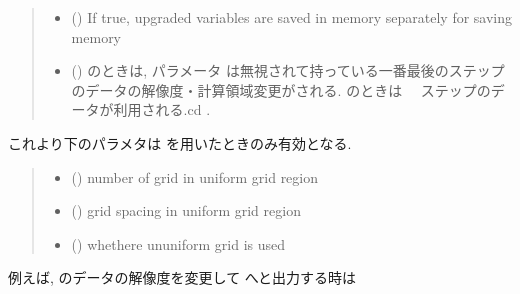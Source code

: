 \documentclass[letterpaper,10pt,dvipdfmx,report]{sphinxmanual}
\begin{document}
\begin{fulllineitems}
\begin{quote}
\begin{description}
\begin{itemize}
\item {} 
\sphinxAtStartPar
{} () \sphinxhyphen{}\sphinxhyphen{} If true, upgraded variables are saved in memory separately for saving memory

\item {} 
\sphinxAtStartPar
{} () \sphinxhyphen{}\sphinxhyphen{}  のときは, パラメータ  は無視されて持っている一番最後のステップのデータの解像度・計算領域変更がされる.  のときは　 ステップのデータが利用される.cd .

\end{itemize}

\end{description}\end{quote}

\sphinxAtStartPar
これより下のパラメタは  を用いたときのみ有効となる.
\begin{quote}\begin{description}
\begin{itemize}
\item {} 
\sphinxAtStartPar
{} () \sphinxhyphen{}\sphinxhyphen{} number of grid in uniform grid region

\item {} 
\sphinxAtStartPar
{} () \sphinxhyphen{}\sphinxhyphen{} grid spacing in uniform grid region

\item {} 
\sphinxAtStartPar
{} () \sphinxhyphen{}\sphinxhyphen{} whethere ununiform grid is used

\end{itemize}

\end{description}\end{quote}

\end{fulllineitems}


\sphinxAtStartPar
例えば,  のデータの解像度を変更して  へと出力する時は
\end{document}
